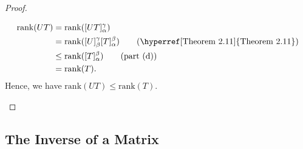 \begin{proof}
\begin{enumerate}
        \begin{align*}
            \text{rank}(UT) &= \text{rank}([UT]_{\alpha}^{\gamma} ) \\
                            &= \text{rank}([U]_{\beta}^{\gamma}  [T]_{\alpha}^{\beta} ) \tag{{\hyperref[Theorem 2.11]{Theorem 2.11}}} \\
                            &\leq \text{rank}([T]_{\alpha}^{\beta}) \tag{part (d)} \\
                            &= \text{rank}(T).
        \end{align*}
        Hence, we have \( \text{rank}(UT) \leq \text{rank}(T) \).
\end{enumerate}
\end{proof}

\subsection{The Inverse of a Matrix}

